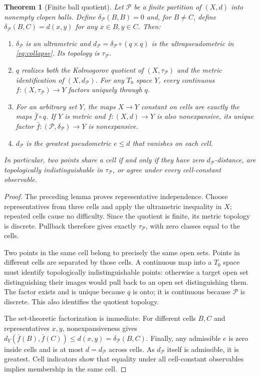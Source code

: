 \documentclass[11pt]{article}
\newtheorem{theorem}{Theorem}[section]
\theoremstyle{definition}
\theoremstyle{remark}
\newcommand{\PP}{\mathcal P}
\begin{document}
\begin{theorem}[Finite ball quotient]\label{thm:quotient}
Let $\PP$ be a finite partition of $(X,d)$ into nonempty clopen balls. Define $\delta_{\PP}(B,B)=0$ and, for $B\ne C$, define $\delta_{\PP}(B,C)=d(x,y)$ for any $x\in B,y\in C$. Then:
\begin{enumerate}[label=(\roman*)]
\item $\delta_{\PP}$ is an ultrametric and $d_{\PP}=\delta_{\PP}\circ(q\times q)$ is the ultrapseudometric in \eqref{eq:collapse}. Its topology is $\tau_{\PP}$.
\item $q$ realizes both the Kolmogorov quotient of $(X,\tau_{\PP})$ and the metric identification of $(X,d_{\PP})$. For any $T_0$ space $Y$, every continuous $f:(X,\tau_{\PP})\to Y$ factors uniquely through $q$.
\item For an arbitrary set $Y$, the maps $X\to Y$ constant on cells are exactly the maps $\bar f\circ q$. If $Y$ is metric and $f:(X,d)\to Y$ is also nonexpansive, its unique factor $\bar f:(\PP,\delta_{\PP})\to Y$ is nonexpansive.
\item $d_{\PP}$ is the greatest pseudometric $e\leq d$ that vanishes on each cell.
\end{enumerate}
In particular, two points share a cell if and only if they have zero $d_{\PP}$-distance, are topologically indistinguishable in $\tau_{\PP}$, or agree under every cell-constant observable.
\end{theorem}
\begin{proof}
The preceding lemma proves representative independence. Choose representatives from three cells and apply the ultrametric inequality in $X$; repeated cells cause no difficulty. Since the quotient is finite, its metric topology is discrete. Pullback therefore gives exactly $\tau_{\PP}$, with zero classes equal to the cells.

Two points in the same cell belong to precisely the same open sets. Points in different cells are separated by those cells. A continuous map into a $T_0$ space must identify topologically indistinguishable points: otherwise a target open set distinguishing their images would pull back to an open set distinguishing them. The factor exists and is unique because $q$ is onto; it is continuous because $\PP$ is discrete. This also identifies the quotient topology.

The set-theoretic factorization is immediate. For different cells $B,C$ and representatives $x,y$, nonexpansiveness gives
$d_Y(\bar f(B),\bar f(C))\leq d(x,y)=\delta_{\PP}(B,C)$.
Finally, any admissible $e$ is zero inside cells and is at most $d=d_{\PP}$ across cells. As $d_{\PP}$ itself is admissible, it is greatest. Cell indicators show that equality under all cell-constant observables implies membership in the same cell.
\end{proof}
\end{document}
